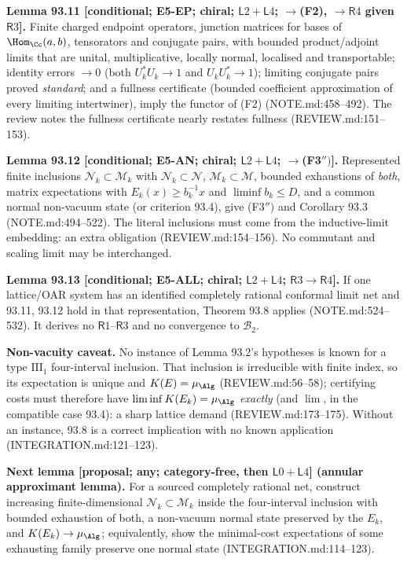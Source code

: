 \textbf{Lemma 93.11 [conditional; E5-EP; chiral; \(\mathsf L2{+}\mathsf L4\); \(\to\)(F2), \(\to\mathsf R4\) given \(\mathsf R3\)].}  Finite charged endpoint operators, junction
matrices for bases of \(\Hom_\Cc(a,b)\), tensorators and conjugate pairs, with bounded product/adjoint limits that are
unital, multiplicative, locally normal, localised and transportable; identity errors \(\to0\) (both \(U_k^*U_k\to1\) and
\(U_kU_k^*\to1\)); limiting conjugate pairs proved \emph{standard}; and a fullness certificate (bounded coefficient
approximation of every limiting intertwiner), imply the functor of (F2) (NOTE.md:458--492).  The review notes the fullness
certificate nearly restates fullness (REVIEW.md:151--153).

\textbf{Lemma 93.12 [conditional; E5-AN; chiral; \(\mathsf L2{+}\mathsf L4\); \(\to\)(F3\('')\)].}  Represented finite inclusions \(\mathcal N_k\subset\mathcal M_k\)
with \(\mathcal N_k\subset\mathcal N\), \(\mathcal M_k\subset\mathcal M\), bounded exhaustions of \emph{both}, matrix expectations with
\(E_k(x)\ge b_k^{-1}x\) and \(\liminf b_k\le D\), and a common normal non-vacuum state (or criterion 93.4), give (F3\('')\) and
Corollary 93.3 (NOTE.md:494--522).  The literal inclusions must come from the inductive-limit embedding: an extra
obligation (REVIEW.md:154--156).  No commutant and scaling limit may be interchanged.

\textbf{Lemma 93.13 [conditional; E5-ALL; chiral; \(\mathsf L2{+}\mathsf L4\); \(\mathsf R3\to\mathsf R4\)].}  If one lattice/OAR system has an identified completely
rational conformal limit net and 93.11, 93.12 hold in that representation, Theorem 93.8 applies (NOTE.md:524--532).  It
derives no \(\mathsf R1\)--\(\mathsf R3\) and no convergence to \(\mathcal B_2\).

\textbf{Non-vacuity caveat.}  No instance of Lemma 93.2's hypotheses is known for a type \(\mathrm{III}_1\) four-interval
inclusion.  That inclusion is irreducible with finite index, so its expectation is unique and \(K(E)=\mu_\Alg\)
(REVIEW.md:56--58); certifying costs must therefore have \(\liminf K(E_k)=\mu_\Alg\) \emph{exactly} (and \(\lim\), in the
compatible case 93.4): a sharp lattice demand (REVIEW.md:173--175).  Without an instance, 93.8 is a correct
implication with no known application (INTEGRATION.md:121--123).

\textbf{Next lemma [proposal; any; category-free, then \(\mathsf L0{+}\mathsf L4\)] (annular approximant lemma).}  For a sourced
completely rational net, construct increasing finite-dimensional \(\mathcal N_k\subset\mathcal M_k\) inside the four-interval
inclusion with bounded exhaustion of both, a non-vacuum normal state preserved by the \(E_k\), and \(K(E_k)\to\mu_\Alg\);
equivalently, show the minimal-cost expectations of some exhausting family preserve one normal state
(INTEGRATION.md:114--123).


